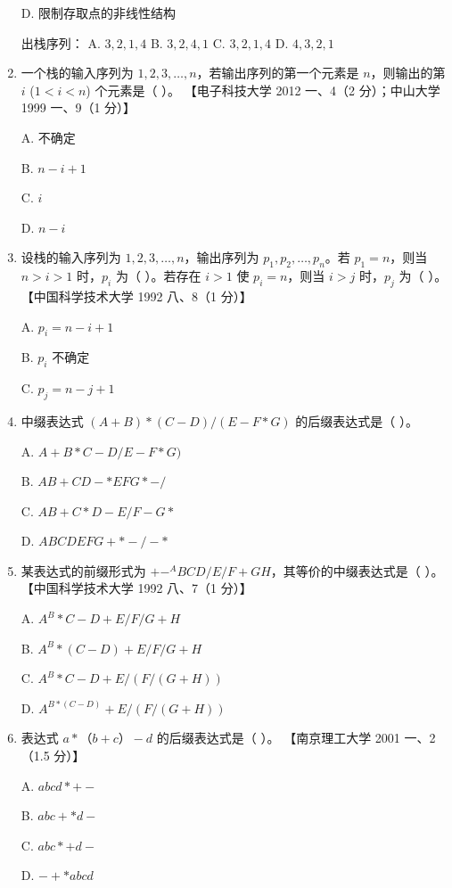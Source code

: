 \documentclass[lang=cn,newtx,10pt,scheme=chinese]{elegantbook}
\begin{document}
\begin{enumerate}
    D. 限制存取点的非线性结构  

    出栈序列：  
    A. $3, 2, 1, 4$ \quad B. $3, 2, 4, 1$ \quad C. $3, 2, 1, 4$ \quad D. $4, 3, 2, 1$  

    \item 一个栈的输入序列为 $1, 2, 3, \ldots, n$，若输出序列的第一个元素是 $n$，则输出的第 $i$ ($1 < i < n$) 个元素是（ ）。  
    【电子科技大学 2012 一、4（2 分）；中山大学 1999 一、9（1 分）】  

    A. 不确定  

    B. $n - i + 1$  

    C. $i$  

    D. $n-i$  

    \item 设栈的输入序列为 $1, 2, 3, \ldots, n$，输出序列为 $p_1, p_2, \ldots, p_n$。若 $p_1 = n$，则当 $n > i > 1$ 时，$p_i$ 为（ ）。若存在 $i > 1$ 使 $p_i = n$，则当 $i > j$ 时，$p_j$ 为（ ）。  
    【中国科学技术大学 1992 八、8（1 分）】  

    A. $p_i = n - i + 1$  

    B. $p_i$ 不确定  

    C. $p_j = n - j + 1$  

    \item 中缀表达式 $(A + B) * (C - D) / (E - F * G)$ 的后缀表达式是（ ）。  
   
    A. $A + B* C - D / E - F * G)$  

    B. $AB+CD-*EFG*-/$  

    C. $AB+C*D-E/F-G*$  

    D. $ABCDEFG+*-/-*$  
 

    \item 某表达式的前缀形式为 $+- ^ABCD/E/F + GH$，其等价的中缀表达式是（ ）。  
    【中国科学技术大学 1992 八、7（1 分）】  

    A. $A^B*C-D+E/F/G+H$  

    B. $A^B*(C-D) + E/F/G + H$  

    C. $A^B*C-D+E/(F/(G+H))$  

    D. $A^{B*(C-D)} +E/(F/(G+H))$  

    \item 表达式 $a*（b+c）-d$ 的后缀表达式是（ ）。  
    【南京理工大学 2001 一、2（1.5 分）】  

    A. $abcd *+-$  

    B. $abc+*d-$  

    C. $a b c * + d -$  

    D. $-+*abcd$  


\end{enumerate}
\end{document}
